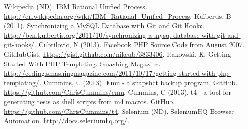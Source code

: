 \newpage
\begin{thebibliography}{9}
 Wikipedia (ND). IBM Rational Unified Process.
  \url{http://en.wikipedia.org/wiki/IBM\_Rational\_Unified\_Process}.
 Kulbertis, B (2011). Synchronizing a MySQL Database with
  Git and Git
  Hooks. \url{http://ben.kulbertis.org/2011/10/synchronizing-a-mysql-database-with-git-and-git-hooks/}.
 Cubrilovic, N (2013). Facebook PHP Source Code from
  August 2007. GitHubGist. \url{https://gist.github.com/nikcub/3833406}.
 Rakowski, K. Getting Started With PHP
  Templating. Smashing
  Magazine. \url{http://coding.smashingmagazine.com/2011/10/17/getting-started-with-php-templating/}.
 Cummins, C (2013). Emu - a snapshot backup
  program. GitHub. \url{https://github.com/ChrisCummins/emu}.
 Cummins, C (2013). t4 - a tool for generating tests as
shell scripts from m4 macros. GitHub. \url{https://github.com/ChrisCummins/t4}.
 Selenium (ND). SeleniumHQ Browser
Automation. \url{http://docs.seleniumhq.org/}.
\end{thebibliography}

